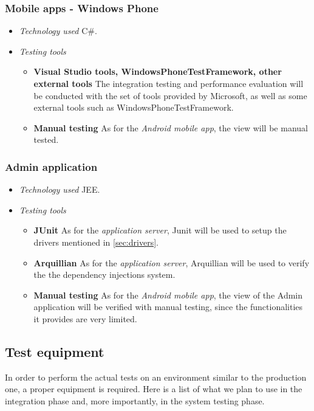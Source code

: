 	\subsubsection*{Mobile apps - Windows Phone}
		\begin{itemize}[label={},leftmargin=*,noitemsep,topsep=0pt]
			\item \textit{Technology used} C\#.
			\item \textit{Testing tools}
				\begin{itemize}[label={},noitemsep]
					\item \textbf{Visual Studio tools, WindowsPhoneTestFramework, other external tools} The integration testing and performance evaluation will be conducted with the set of tools provided by Microsoft, as well as some external tools such as WindowsPhoneTestFramework. 
					\item \textbf{Manual testing} As for the \textit{Android mobile app}, the view will be manual tested.
				\end{itemize}
		\end{itemize}

	\subsubsection*{Admin application}
		\begin{itemize}[label={},leftmargin=*,noitemsep,topsep=0pt]
			\item \textit{Technology used} JEE.
			\item \textit{Testing tools}
				\begin{itemize}[label={},noitemsep]
					\item \textbf{JUnit} As for the \textit{application server}, Junit will be used to setup the drivers mentioned in \autoref{sec:drivers}.
					\item \textbf{Arquillian} As for the \textit{application server}, Arquillian will be used to verify the the dependency injections system.
					\item \textbf{Manual testing} As for the \textit{Android mobile app}, the view of the Admin application will be verified with manual testing, since the functionalities it provides are very limited.
				\end{itemize}
		\end{itemize}

\subsection{Test equipment}
	In order to perform the actual tests on an environment similar to the production one, a proper equipment is required. Here is a list of what we plan to use in the integration phase and, more importantly, in the system testing phase.

